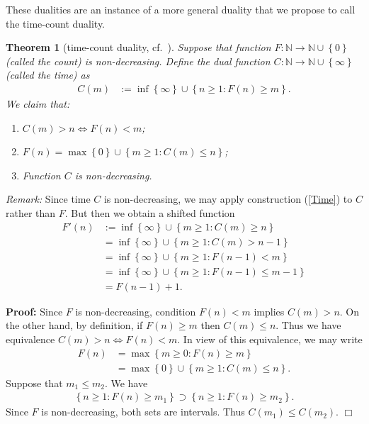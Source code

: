 \documentclass[a4paper,12pt]{article}
\newcommand{\klam}[1]{\left\{ #1 \right\}}
\newtheorem{theorem}{Theorem}
\newenvironment*{proof}{\begin{trivlist}\item[]
\noindent\textbf{Proof:}}{$\Box$\par\end{trivlist}}
\begin{document}
These dualities are an instance of a more general duality that we
propose to call the time-count duality.
\begin{theorem}[time-count duality, cf.\ \citep{WynerZiv89}]
  \label{theoTimeCount}
  Suppose that function
  $F:\mathbb{N}\rightarrow\mathbb{N}\cup\klam{0}$ (called the count)
  is non-decreasing. Define the dual function
  $C:\mathbb{N}\rightarrow\mathbb{N}\cup\klam{\infty}$ (called
  the time) as
  \begin{align}
    \label{Time}
    C(m)&:=\inf\klam{\infty}\cup\klam{n\ge 1: F(n)\ge m}.
  \end{align}
  We claim that:
  \begin{enumerate}
  \item $C(m)>n\iff F(n)<m$;    
  \item $F(n)=\max\klam{0}\cup\klam{m\ge 1: C(m)\le n}$;    
  \item Function $C$ is non-decreasing.
  \end{enumerate}
\end{theorem}
\emph{Remark:} Since time $C$ is non-decreasing, we may apply
construction (\ref{Time}) to $C$ rather than $F$. But then we obtain a
shifted function
\begin{align}
  F'(n)
  &:=\inf\klam{\infty}\cup\klam{m\ge 1: C(m)\ge n}
    \nonumber\\
  &=
  \inf\klam{\infty}\cup\klam{m\ge 1: C(m)>n-1}
    \nonumber\\
  &=
  \inf\klam{\infty}\cup\klam{m\ge 1: F(n-1)<m}
    \nonumber\\
  &=
    \inf\klam{\infty}\cup\klam{m\ge 1: F(n-1)\le m-1}
    \nonumber\\
  &=F(n-1)+1.
\end{align}
\begin{proof}
  Since $F$ is non-decreasing, condition $F(n)<m$ implies $C(m)>n$.
  On the other hand, by definition, if $F(n)\ge m$ then $C(m)\le n$.
  Thus we have equivalence $C(m)>n\iff F(n)<m$.  In view of this
  equivalence, we may write
  \begin{align}
    F(n)&=\max\klam{m\ge 0: F(n)\ge m}
    \nonumber\\
        &=\max\klam{0}\cup\klam{m\ge 1: C(m)\le n}
    .
  \end{align}
  Suppose that $m_1\le m_2$. We have
  \begin{align}
    \klam{n\ge 1: F(n)\ge m_1}\supset \klam{n\ge 1: F(n)\ge
    m_2}.
  \end{align}
  Since $F$ is non-decreasing, both sets are intervals. Thus
  $C(m_1)\le C(m_2)$.
\end{proof}
\end{document}
